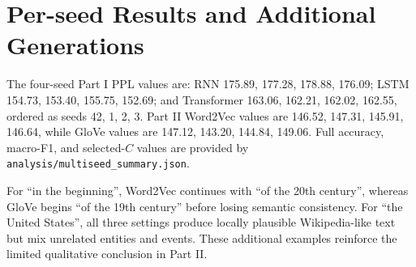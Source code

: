 \documentclass[11pt,a4paper]{article}
\begin{document}



\appendix
\section{Per-seed Results and Additional Generations}
The four-seed Part I PPL values are: RNN 175.89, 177.28, 178.88, 176.09; LSTM 154.73, 153.40,
155.75, 152.69; and Transformer 163.06, 162.21, 162.02, 162.55, ordered as seeds 42, 1, 2, 3.
Part II Word2Vec values are 146.52, 147.31, 145.91, 146.64, while GloVe values are 147.12,
143.20, 144.84, 149.06. Full accuracy, macro-F1, and selected-$C$ values are provided by
\texttt{analysis/multiseed\_summary.json}.

For ``in the beginning'', Word2Vec continues with ``of the 20th century'', whereas GloVe begins
``of the 19th century'' before losing semantic consistency. For ``the United States'', all three
settings produce locally plausible Wikipedia-like text but mix unrelated entities and events.
These additional examples reinforce the limited qualitative conclusion in Part II.
\end{document}
